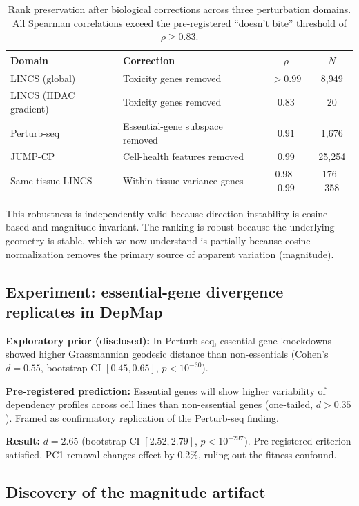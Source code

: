 \documentclass[11pt]{article}
\begin{document}
\begin{table}[h]
\centering
\caption{Rank preservation after biological corrections across three
perturbation domains. All Spearman correlations exceed the pre-registered
``doesn't bite'' threshold of $\rho \geq 0.83$.}
\label{tab:robustness}
\begin{tabular}{llcc}
\toprule
Domain & Correction & $\rho$ & $N$ \\
\midrule
LINCS (global) & Toxicity genes removed & $>0.99$ & 8{,}949 \\
LINCS (HDAC gradient) & Toxicity genes removed & $0.83$ & 20 \\
Perturb-seq & Essential-gene subspace removed & $0.91$ & 1{,}676 \\
JUMP-CP & Cell-health features removed & $0.99$ & 25{,}254 \\
\midrule
Same-tissue LINCS & Within-tissue variance genes & $0.98$--$0.99$ & 176--358 \\
\bottomrule
\end{tabular}
\end{table}

This robustness is independently valid because direction instability is
cosine-based and magnitude-invariant. The ranking is robust because the
underlying geometry is stable, which we now understand is partially
because cosine normalization removes the primary source of apparent
variation (magnitude).

\subsection{Experiment: essential-gene divergence replicates in DepMap}

\textbf{Exploratory prior (disclosed):} In Perturb-seq, essential gene
knockdowns showed higher Grassmannian geodesic distance than non-essentials
(Cohen's $d = 0.55$, bootstrap CI $[0.45, 0.65]$, $p < 10^{-30}$).

\textbf{Pre-registered prediction:} Essential genes will show higher
variability of dependency profiles across cell lines than non-essential
genes (one-tailed, $d > 0.35$). Framed as confirmatory replication of
the Perturb-seq finding.

\textbf{Result:} $d = 2.65$ (bootstrap CI $[2.52, 2.79]$, $p <
10^{-297}$). Pre-registered criterion satisfied. PC1 removal changes
effect by 0.2\%, ruling out the fitness confound.

\subsection{Discovery of the magnitude artifact}
\label{sec:artifact}
\end{document}
